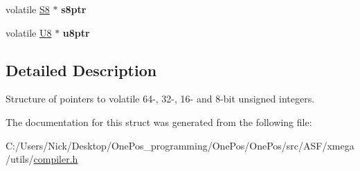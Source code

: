 \begin{DoxyCompactItemize}
\item 
\hypertarget{struct_struct_v_ptr_a4b6384d064d24aad80d7d1e74d2407eb}{volatile \hyperlink{group__group__xmega__utils_gaf1475a0bb1962ef08dd1f78bd5dba87a}{S8} $\ast$ {\bfseries s8ptr}}\label{struct_struct_v_ptr_a4b6384d064d24aad80d7d1e74d2407eb}

\item 
\hypertarget{struct_struct_v_ptr_a059e13e212713a7f29e1a34666041875}{volatile \hyperlink{group__group__xmega__utils_gaa63ef7b996d5487ce35a5a66601f3e73}{U8} $\ast$ {\bfseries u8ptr}}\label{struct_struct_v_ptr_a059e13e212713a7f29e1a34666041875}

\end{DoxyCompactItemize}


\subsection{Detailed Description}
Structure of pointers to volatile 64-\/, 32-\/, 16-\/ and 8-\/bit unsigned integers. 

The documentation for this struct was generated from the following file\-:\begin{DoxyCompactItemize}
\item 
C\-:/\-Users/\-Nick/\-Desktop/\-One\-Pos\-\_\-programming/\-One\-Pos/\-One\-Pos/src/\-A\-S\-F/xmega/utils/\hyperlink{compiler_8h}{compiler.\-h}\end{DoxyCompactItemize}
